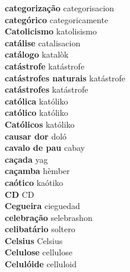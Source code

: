 \textbf{ categorização  } categorisacion \\
\textbf{ categórico  } categoricamente \\
\textbf{ Catolicismo  } katolisismo \\
\textbf{ catálise  } catalisacion \\
\textbf{ catálogo  } katalòk \\
\textbf{ catástrofe  } katástrofe \\
\textbf{ catástrofes naturais  } katástrofe \\
\textbf{ catástrofes  } katástrofe \\
\textbf{ católica  } katóliko \\
\textbf{ católico  } katóliko \\
\textbf{ Católicos  } katóliko \\
\textbf{ causar dor  } doló \\
\textbf{ cavalo de pau  } cabay \\
\textbf{ caçada  } yag \\
\textbf{ caçamba  } hèmber \\
\textbf{ caótico  } kaótiko \\
\textbf{ CD  } CD \\
\textbf{ Cegueira  } cieguedad \\
\textbf{ celebração  } selebrashon \\
\textbf{ celibatário  } soltero \\
\textbf{ Celsius  } Celsius \\
\textbf{ Celulose  } cellulose \\
\textbf{ Celulóide  } celluloid \\

